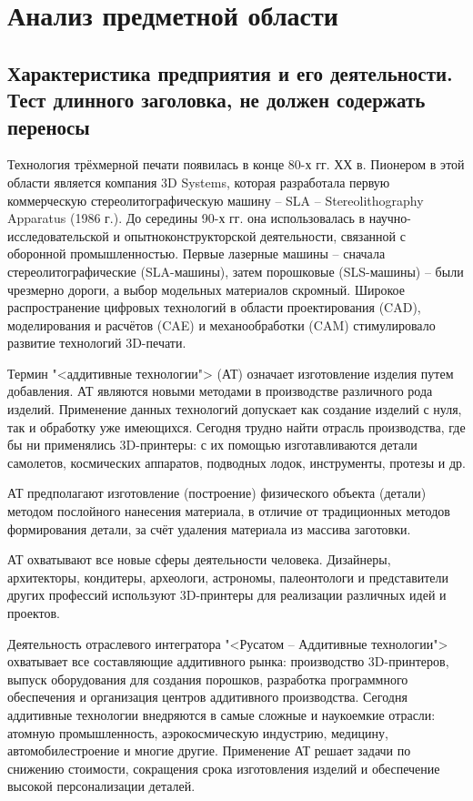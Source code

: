 \section{Анализ предметной области}
\subsection{Характеристика предприятия и его деятельности. Тест длинного заголовка, не должен содержать переносы}

Технология трёхмерной печати появилась в конце 80-х гг. ХХ в. Пионером в этой области является компания 3D Systems, которая разработала первую коммерческую стереолитографическую машину – SLA – \linebreak Stereolithography Apparatus (1986 г.). До середины 90-х гг. она использовалась в научно-исследовательской и опытноконструкторской деятельности, связанной с оборонной промышленностью. Первые лазерные машины – сначала стереолитографические (SLA-машины), затем порошковые (SLS-машины) – были чрезмерно дороги, а выбор модельных материалов скромный. Широкое распространение цифровых технологий в области проектирования (CAD), моделирования и расчётов (CAE) и механообработки (CAM) стимулировало развитие технологий 3D-печати. 

Термин "<аддитивные технологии"> (АТ) означает изготовление изделия путем добавления. АТ являются новыми методами в производстве различного рода изделий. Применение данных технологий допускает как создание изделий с нуля, так и обработку уже имеющихся. Сегодня трудно найти отрасль производства, где бы ни применялись 3D-принтеры: с их помощью изготавливаются детали самолетов, космических аппаратов, подводных лодок, инструменты, протезы и др.

АТ предполагают изготовление (построение) физического объекта (детали) методом послойного нанесения материала, в отличие от традиционных методов формирования детали, за счёт удаления материала из массива заготовки.

АТ охватывают все новые сферы деятельности человека. Дизайнеры, архитекторы, кондитеры, археологи, астрономы, палеонтологи и представители других профессий используют 3D-принтеры для реализации различных идей и проектов. 

Деятельность отраслевого интегратора "<Русатом -- Аддитивные технологии"> охватывает все составляющие аддитивного рынка: производство 3D-принтеров, выпуск оборудования для создания порошков, разработка программного обеспечения и организация центров аддитивного производства. Сегодня аддитивные технологии внедряются в самые сложные и наукоемкие отрасли: атомную промышленность, аэрокосмическую индустрию, медицину, автомобилестроение и многие другие. Применение АТ решает задачи по снижению стоимости, сокращения срока изготовления изделий и обеспечение высокой персонализации деталей.
